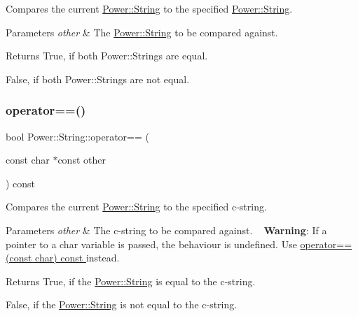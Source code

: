 Compares the current \hyperlink{class_power_1_1_string}{Power\+::\+String} to the specified \hyperlink{class_power_1_1_string}{Power\+::\+String}. 


\begin{DoxyParams}{Parameters}
{\em other} & The \hyperlink{class_power_1_1_string}{Power\+::\+String} to be compared against. \\
\hline
\end{DoxyParams}
\begin{DoxyReturn}{Returns}
True, if both Power\+::\+Strings are equal. 

False, if both Power\+::\+Strings are not equal. 
\end{DoxyReturn}
\mbox{\label{class_power_1_1_string_ae357277377a5d612450fcf852ba5bee9}} 
\subsubsection{\texorpdfstring{operator==()}{operator==()}\hspace{0.1cm}{\footnotesize\ttfamily [2/3]}}
{\footnotesize\ttfamily bool Power\+::\+String\+::operator== (\begin{DoxyParamCaption}\item[{const char $\ast$const}]{other }\end{DoxyParamCaption}) const\hspace{0.3cm}{\ttfamily [inline]}}



Compares the current \hyperlink{class_power_1_1_string}{Power\+::\+String} to the specified c-\/string. 


\begin{DoxyParams}{Parameters}
{\em other} & The c-\/string to be compared against. ~\newline
 {\bfseries Warning}\+: If a pointer to a char variable is passed, the behaviour is undefined. Use \hyperlink{class_power_1_1_string_a9a5cf72ccd272199f2eeb4baeaf7789f}{operator==(const char) const }instead. \\
\hline
\end{DoxyParams}
\begin{DoxyReturn}{Returns}
True, if the \hyperlink{class_power_1_1_string}{Power\+::\+String} is equal to the c-\/string. 

False, if the \hyperlink{class_power_1_1_string}{Power\+::\+String} is not equal to the c-\/string. 
\end{DoxyReturn}
\mbox{\label{class_power_1_1_string_a9a5cf72ccd272199f2eeb4baeaf7789f}} 
